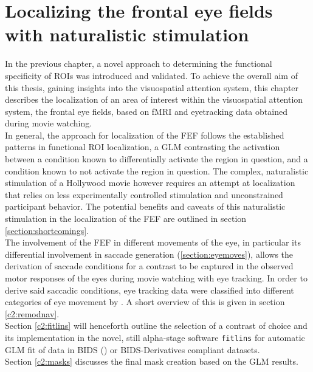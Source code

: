 \documentclass[a4paper, 12pt]{scrreprt}
\begin{document}
\chapter{Localizing the frontal eye fields with naturalistic stimulation}\label{c2}

In the previous chapter, a novel approach to determining the functional specificity of ROIs was introduced and validated. To achieve the overall aim of this thesis, gaining insights into the visuospatial attention system, this chapter describes the localization of an area of interest within the visuospatial attention system, the frontal eye fields, based on fMRI and eyetracking data obtained during movie watching. \\
In general, the approach for localization of the FEF follows the established patterns in functional ROI localization, a GLM contrasting the activation between a condition known to differentially activate the region in question, and a condition known to not activate the region in question. The complex, naturalistic stimulation of a Hollywood movie however requires an attempt at localization that relies on less experimentally controlled stimulation and unconstrained participant behavior. The potential benefits and caveats of this naturalistic stimulation in the localization of the FEF are outlined in section \ref{section:shortcomings}. \\ 
The involvement of the FEF in different movements of the eye, in particular its differential involvement in saccade generation (\ref{section:eyemoves}), allows the derivation of saccade conditions for a contrast to be captured in the observed motor responses of the eyes during movie watching with eye tracking. In order to derive said saccadic conditions, eye tracking data were classified into different categories of eye movement by \textcite{dar2019}. A short overview of this is given in section \ref{c2:remodnav}. \\
Section \ref{c2:fitlins} will henceforth outline the selection of a contrast of choice and its implementation in the novel, still alpha-stage software \texttt{fitlins} for automatic GLM fit of data in BIDS (\cite{gorgolewski2016brain}) or BIDS-Derivatives compliant datasets. \\ Section \ref{c2:masks} discusses the final mask creation based on the GLM results.
\end{document}
